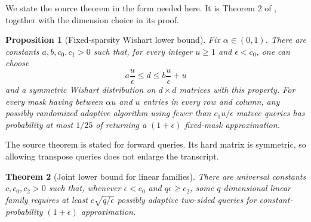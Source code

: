 \documentclass[twoside]{article}
\newtheorem{theorem}{Theorem}
\newtheorem{proposition}[theorem]{Proposition}
\begin{document}
We state the source theorem in the form needed here. It is Theorem 2 of
\citet{amsel2026fixed}, together with the dimension choice in its proof.

\begin{proposition}[Fixed-sparsity Wishart lower bound]
\label{prop:source-lower}
Fix $\alpha\in(0,1)$. There are constants $a,b,c_0,c_1>0$ such that, for
every integer $u\ge1$ and $\epsilon<c_0$, one can choose
\begin{equation}
 a\frac{u}{\epsilon}\le d\le b\frac{u}{\epsilon}+u
 \label{eq:d-range}
\end{equation}
and a symmetric Wishart distribution on $d\times d$ matrices with this
property. For every mask having between $\alpha u$ and $u$ entries in every
row and column, any possibly randomized adaptive algorithm using fewer than
$c_1u/\epsilon$ matvec queries has probability at most $1/25$ of returning a
$(1+\epsilon)$ fixed-mask approximation.
\end{proposition}

The source theorem is stated for forward queries. Its hard matrix is
symmetric, so allowing transpose queries does not enlarge the transcript.

\begin{theorem}[Joint lower bound for linear families]
\label{thm:joint-lower}
There are universal constants $c,c_0,c_2>0$ such that, whenever
$\epsilon<c_0$ and $q\epsilon\ge c_2$, some $q$-dimensional linear family
requires at least $c\sqrt{q/\epsilon}$ possibly adaptive two-sided queries
for constant-probability $(1+\epsilon)$ approximation.
\end{theorem}
\end{document}
